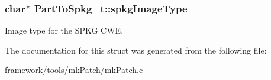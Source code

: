 \subsubsection[{\texorpdfstring{spkg\+Image\+Type}{spkgImageType}}]{\setlength{\rightskip}{0pt plus 5cm}char$\ast$ Part\+To\+Spkg\+\_\+t\+::spkg\+Image\+Type}\hypertarget{struct_part_to_spkg__t_a756c25a9a3e10451d6a00cec8714dfb0}{}\label{struct_part_to_spkg__t_a756c25a9a3e10451d6a00cec8714dfb0}


Image type for the S\+P\+KG C\+WE. 



The documentation for this struct was generated from the following file\+:\begin{DoxyCompactItemize}
\item 
framework/tools/mk\+Patch/\hyperlink{mk_patch_8c}{mk\+Patch.\+c}\end{DoxyCompactItemize}

